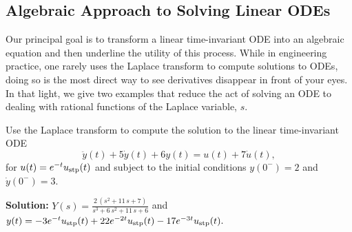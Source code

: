 \subsection{Algebraic Approach to Solving Linear ODEs}
\label{sec:transferFunctions}

Our principal goal is to transform a linear time-invariant ODE into an algebraic equation and then underline the utility of this process. While in engineering practice, one rarely uses the Laplace transform to compute solutions to ODEs, doing so is the most direct way to see derivatives disappear in front of your eyes. In that light, we give two examples that reduce the act of solving an ODE to dealing with rational functions of the Laplace variable, $s$.\\


\begin{example} 
\label{ex:solvingODEviaLaplaceTransform}
Use the Laplace transform to compute the solution to the linear time-invariant ODE 
\begin{equation}
    \label{eq:SolveLinearODEviaLaplaceTransform}
    \ddot{y}(t) + 5 \dot{y}(t) + 6 y(t) = u(t) + 7 \dot{u}(t),
\end{equation}
for $u(t) = e^{-t} u_{\rm stp}(t)$ and subject to the initial conditions $y(0^-)=2$ and $\dot{y}(0^-) = 3$.

\end{example}
\textbf{Solution:} \quad \Ans \quad $Y(s) = \frac{2  \, \left( s^{2} + 11  \, s + 7 \right)}{s^{3} + 6  \, s^{2} + 11  \, s + 6}$ \quad and \quad $y(t) = -3  e^{-t} u_{\rm stp}(t) + 22 e^{-2t} u_{\rm stp}(t)  - 17 e^{-3t} u_{\rm stp}(t).$\\


